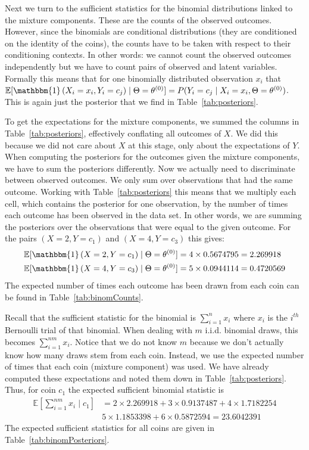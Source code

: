 \documentclass[11pt,leqno,a4paper]{report}\usepackage[]{graphicx}\usepackage[]{color}
\newcommand{\E}{\mathbb{E}}
\newcommand{\id}[1]{\mathbbm{1}\left(#1\right)}
\begin{document}
Next we turn to the sufficient statistics for the binomial distributions linked to the mixture components. These are the counts of the observed outcomes. However,
since the binomials are conditional distributions (they are conditioned on the identity of the coins), the counts have to be taken with respect to their conditioning
contexts. In other words: we cannot count the observed outcomes independently but we have to count pairs of observed and latent variables. Formally this means that 
for one binomially distributed observation $ x_{i} $ that $ \E[\id{X_{i}=x_{i},Y_{i}=c_{j}} \mid \Theta=\theta^{(0)}] = P(Y_{i}=c_{j} \mid X_{i}=x_{i}, \Theta=\theta^{(0)}) $. This is again
just the posterior that we find in Table~\ref{tab:posteriors}. 

To get the expectations for the mixture components, we summed the columns in Table~\ref{tab:posteriors}, effectively conflating all outcomes of $ X $. We did this
because we did not care about $ X $ at this stage, only about the expectations of $ Y $. When computing the posteriors for the outcomes given the mixture components,
we have to sum the posteriors differently. Now we actually need to discriminate between
observed outcomes. We only sum over observations that had the same outcome. Working with Table~\ref{tab:posteriors} this means that we multiply each
cell, which contains the posterior for one observation, by the number of times each outcome has been observed in the data set. In other words, we are summing
the posteriors over the observations that were equal to the given outcome. For the pairs $ (X=2,Y=c_{1}) $
and $ (X=4,Y = c_{3}) $ this gives:
\begin{align}
\E[\id{X=2,Y=c_{1}} \mid \Theta=\theta^{(0)}] &= 4 \times 0.5674795 = 2.269918 \\
\E[\id{X=4,Y=c_{3}} \mid \Theta=\theta^{(0)}] &= 5 \times 0.0944114 = 0.4720569
\end{align} 
The expected number of times each outcome has been drawn from each coin can be found in Table~\ref{tab:binomCounts}. 

Recall that the sufficient statistic for the binomial is 
$ \sum_{i=1}^{n} x_{i} $ where $ x_{i} $ is the $ i^{th} $ Bernoulli trial of that binomial. 
When dealing with $ m $ i.i.d. binomial draws, this becomes $ \sum_{i=1}^{nm} x_{i} $. Notice that we do not
know $ m $ because we don't actually know how many draws stem from each coin. Instead, we use the expected number of times
that each coin (mixture component) was used. We have already computed these expectations and noted them down in Table~\ref{tab:posteriors}. Thus, for coin $ c_{1} $
the expected sufficient binomial statistic is
\begin{align}
\E\left[\sum_{i=1}^{nm} x_{i}\mid c_{1}\right] &= 2 \times 2.269918 + 3 \times 0.9137487 + 4 \times 1.7182254  \\
&5 \times 1.1853398 + 6 \times 0.5872594 = 23.6042391 \nonumber
\end{align}
The expected sufficient statistics for all coins are given in Table~\ref{tab:binomPosteriors}.
\end{document}
